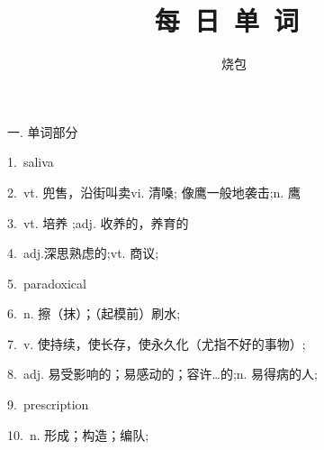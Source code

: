 \documentclass[a4paper, 12pt]{article}
\begin{document}
    \noindent

    \title{ 每\ 日\ 单\ 词\  }
    \author{ 烧包 }
    \maketitle

\begin{flushleft}
一. 单词部分
\end{flushleft}

\begin{multicols}{2}
\begin{flushleft}
1.\ saliva \ \ \ \ \underline{\hspace{3cm}}
\end{flushleft}

\begin{flushleft}
2.\ vt. 兜售，沿街叫卖vi. 清嗓; 像鹰一般地袭击;n. 鹰 \ \ \ \ \underline{\hspace{3cm}}
\end{flushleft}
\end{multicols}

\begin{multicols}{2}
\begin{flushleft}
3.\ vt. 培养 ;adj. 收养的，养育的 \ \ \ \ \underline{\hspace{3cm}}
\end{flushleft}

\begin{flushleft}
4.\ adj.深思熟虑的;vt. 商议; \ \ \ \ \underline{\hspace{3cm}}
\end{flushleft}
\end{multicols}

\begin{multicols}{2}
\begin{flushleft}
5.\ paradoxical \ \ \ \ \underline{\hspace{3cm}}
\end{flushleft}

\begin{flushleft}
6.\ n. 擦（抹）；（起模前）刷水; \ \ \ \ \underline{\hspace{3cm}}
\end{flushleft}
\end{multicols}

\begin{multicols}{2}
\begin{flushleft}
7.\ v. 使持续，使长存，使永久化（尤指不好的事物）; \ \ \ \ \underline{\hspace{3cm}}
\end{flushleft}

\begin{flushleft}
8.\ adj. 易受影响的；易感动的；容许…的;n. 易得病的人; \ \ \ \ \underline{\hspace{3cm}}
\end{flushleft}
\end{multicols}

\begin{multicols}{2}
\begin{flushleft}
9.\ prescription \ \ \ \ \underline{\hspace{3cm}}
\end{flushleft}

\begin{flushleft}
10.\ n. 形成；构造；编队; \ \ \ \ \underline{\hspace{3cm}}
\end{flushleft}
\end{multicols}
\end{document}
